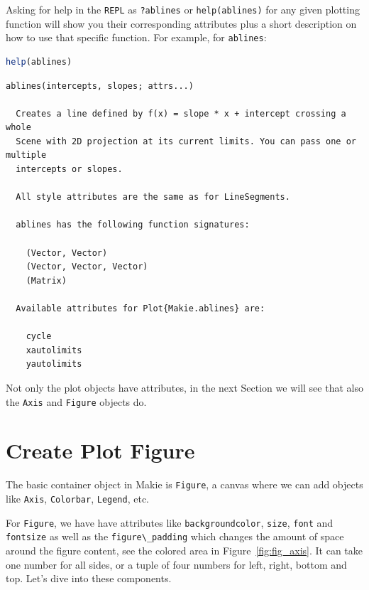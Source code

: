 \documentclass[
  notoc %
]{tufte-book}
\newcommand{\passthrough}[1]{#1}
\begin{document}
Asking for help in the \passthrough{\lstinline!REPL!} as
\passthrough{\lstinline!?ablines!} or
\passthrough{\lstinline!help(ablines)!} for any given plotting function
will show you their corresponding attributes plus a short description on
how to use that specific function. For example, for
\passthrough{\lstinline!ablines!}:

\begin{lstlisting}[language=Julia]
help(ablines)
\end{lstlisting}

\begin{lstlisting}[language=Output]
  ablines(intercepts, slopes; attrs...)

  Creates a line defined by f(x) = slope * x + intercept crossing a whole
  Scene with 2D projection at its current limits. You can pass one or multiple
  intercepts or slopes.

  All style attributes are the same as for LineSegments.

  ablines has the following function signatures:

    (Vector, Vector)
    (Vector, Vector, Vector)
    (Matrix)

  Available attributes for Plot{Makie.ablines} are:

    cycle
    xautolimits
    yautolimits
\end{lstlisting}

Not only the plot objects have attributes, in the next Section we will
see that also the \passthrough{\lstinline!Axis!} and
\passthrough{\lstinline!Figure!} objects do.

\hypertarget{sec:datavisMakie_create_Figure}{%
\section{Create Plot Figure}\label{sec:datavisMakie_create_Figure}}

The basic container object in Makie is \passthrough{\lstinline!Figure!},
a canvas where we can add objects like \passthrough{\lstinline!Axis!},
\passthrough{\lstinline!Colorbar!}, \passthrough{\lstinline!Legend!},
etc.

For \passthrough{\lstinline!Figure!}, we have have attributes like
\passthrough{\lstinline!backgroundcolor!},
\passthrough{\lstinline!size!}, \passthrough{\lstinline!font!} and
\passthrough{\lstinline!fontsize!} as well as the
\passthrough{\lstinline!figure\_padding!} which changes the amount of
space around the figure content, see the colored area in
Figure~\ref{fig:fig_axis}. It can take one number for all sides, or a
tuple of four numbers for left, right, bottom and top. Let's dive into
these components.
\end{document}
